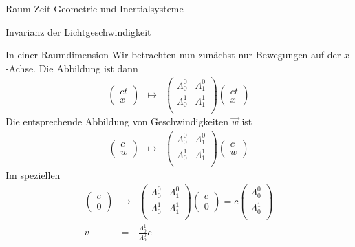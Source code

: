 \begin{chapter}{\titlestr}
\begin{section}{Raum-Zeit-Geometrie und Inertialsysteme}
\begin{subsection}{Invarianz der Lichtgeschwindigkeit}
\begin{subsubsection}{In einer Raumdimension}
Wir betrachten nun zunächst nur Bewegungen auf der $x$-Achse. Die Abbildung
ist dann
\begin{eqnarray*}
\begin{pmatrix}
ct\\
x
\end{pmatrix}
&\mapsto&
\begin{pmatrix}
\Lambda^0_0 &\Lambda^0_1\\
\Lambda^1_0 &\Lambda^1_1\\
\end{pmatrix}
\begin{pmatrix}
ct\\
x
\end{pmatrix}
\end{eqnarray*}
Die entsprechende Abbildung von Geschwindigkeiten $\vec{w}$ ist
\begin{eqnarray*}
\begin{pmatrix}
c\\
w
\end{pmatrix}
&\mapsto&
\begin{pmatrix}
\Lambda^0_0 &\Lambda^0_1\\
\Lambda^1_0 &\Lambda^1_1\\
\end{pmatrix}
\begin{pmatrix}
c\\
w
\end{pmatrix}
\end{eqnarray*}
Im speziellen
\begin{eqnarray*}
\begin{pmatrix}
c\\
0
\end{pmatrix}
&\mapsto&
\begin{pmatrix}
\Lambda^0_0 &\Lambda^0_1\\
\Lambda^1_0 &\Lambda^1_1\\
\end{pmatrix}
\begin{pmatrix}
c\\
0
\end{pmatrix}
=
c
\begin{pmatrix}
\Lambda^0_0\\
\Lambda^1_0\\
\end{pmatrix}\\
v &=& \frac{\Lambda^1_0}{\Lambda^0_0}c\\

\end{eqnarray*}
\end{subsubsection}
\end{subsection}
\end{section}
\end{chapter}
